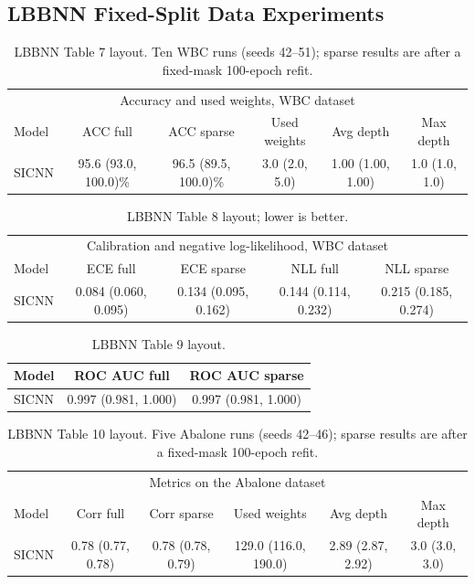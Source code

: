 \documentclass{article}
\begin{document}
\subsection{LBBNN Fixed-Split Data Experiments}
\begin{table}[t]\centering\small
\begin{tabular}{lccccc}\hline\multicolumn{6}{c}{Accuracy and used weights, WBC dataset}\\ Model & ACC full & ACC sparse & Used weights & Avg depth & Max depth\\\hline
SICNN & 95.6 (93.0, 100.0)\% & 96.5 (89.5, 100.0)\% & 3.0 (2.0, 5.0) & 1.00 (1.00, 1.00) & 1.0 (1.0, 1.0)\\\hline\end{tabular}
\caption{LBBNN Table 7 layout. Ten WBC runs (seeds 42--51); sparse results are after a fixed-mask 100-epoch refit.}\end{table}
\begin{table}[t]\centering\small
\begin{tabular}{lcccc}\hline\multicolumn{5}{c}{Calibration and negative log-likelihood, WBC dataset}\\ Model & ECE full & ECE sparse & NLL full & NLL sparse\\\hline
SICNN & 0.084 (0.060, 0.095) & 0.134 (0.095, 0.162) & 0.144 (0.114, 0.232) & 0.215 (0.185, 0.274)\\\hline\end{tabular}
\caption{LBBNN Table 8 layout; lower is better.}\end{table}
\begin{table}[t]\centering\small\begin{tabular}{lcc}\hline Model & ROC AUC full & ROC AUC sparse\\\hline SICNN & 0.997 (0.981, 1.000) & 0.997 (0.981, 1.000)\\\hline\end{tabular}\caption{LBBNN Table 9 layout.}\end{table}
\begin{table}[t]\centering\small
\begin{tabular}{lccccc}\hline\multicolumn{6}{c}{Metrics on the Abalone dataset}\\ Model & Corr full & Corr sparse & Used weights & Avg depth & Max depth\\\hline
SICNN & 0.78 (0.77, 0.78) & 0.78 (0.78, 0.79) & 129.0 (116.0, 190.0) & 2.89 (2.87, 2.92) & 3.0 (3.0, 3.0)\\\hline\end{tabular}
\caption{LBBNN Table 10 layout. Five Abalone runs (seeds 42--46); sparse results are after a fixed-mask 100-epoch refit.}\end{table}
\end{document}
